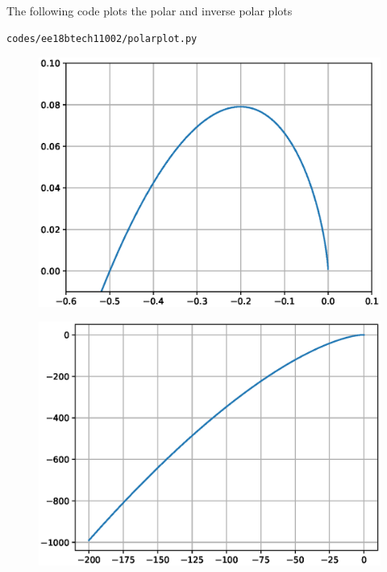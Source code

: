 \begin{enumerate}[label=\thesection.\arabic*.,ref=\thesection.\theenumi]
The following code plots the polar and inverse polar plots 
\begin{lstlisting}
codes/ee18btech11002/polarplot.py
\end{lstlisting}
\begin{figure}
\centering
\includegraphics[width=\columnwidth]{./figs/ee18btech11002(a).eps}
\caption{}
\label{fig:polar_plot}
\end{figure}
\begin{figure}
\centering
\includegraphics[width=\columnwidth]{./figs/ee18btech11002(b).eps}
\caption{}
\label{fig:inverse_polar_plot}
\end{figure}
 


\end{enumerate}
